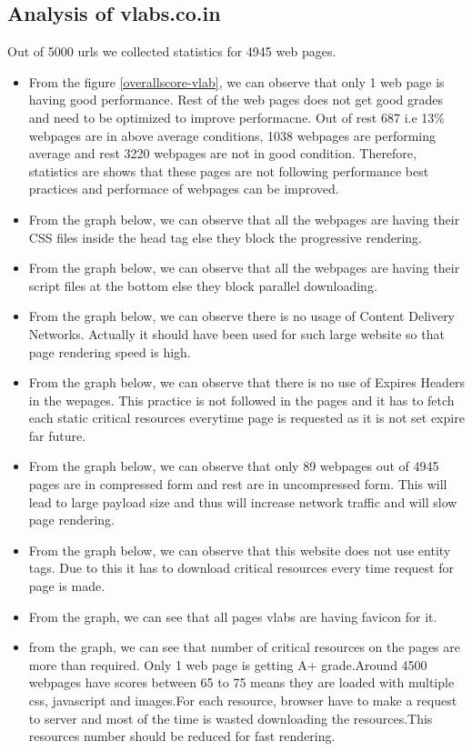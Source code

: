 \documentclass[conference]{IEEEtran}
\begin{document}
\subsection{Analysis of vlabs.co.in}
 Out of 5000 urls we collected statistics for 4945 web pages.
\begin{itemize}
\item From the figure \ref{overallscore-vlab}, we can observe that only 1 web page is having good
performance. Rest of the web pages does not get good grades and need to be
optimized to improve performacne. Out of rest 687 i.e 13\% webpages are in above average conditions, 1038
webpages are performing average and rest 3220 webpages are not in good
condition. Therefore, statistics are shows that these pages are not following
performance best practices and performace of webpages can be improved.  
 
\item From the graph below, we can observe that all the webpages are having their
CSS files inside the head tag else they block the progressive rendering.

\item From the graph below, we can observe that all the webpages are having their
script files at the bottom else they block parallel downloading.

\item From the graph below, we can observe there is no usage of Content Delivery
Networks. Actually it should have been used for such large website so that page
rendering speed is high.

\item From the graph below, we can observe that there is no use of Expires
Headers in the wepages. This practice is not followed in the pages and it has to
fetch each static critical resources everytime page is requested as it is not
set expire far future.

\item From the graph below, we can observe that only 89 webpages out of 4945
pages are in compressed form and rest are in uncompressed form. This will lead to
large payload size and thus will increase network traffic and will slow page
rendering.
\item From the graph below, we can observe that this website does not use entity
tags. Due to this it has to download critical resources every time request for page is
made.
\item From the graph, we can see that all pages vlabs are having favicon for it.
\item from the graph, we can see that number of critical resources  on the pages
are more than required. Only 1 web page is getting A+ grade.Around 4500 webpages
have scores between 65 to 75 means they are loaded with multiple css, javascript
and images.For each resource, browser have to make a request to server and most
of the time is wasted downloading the resources.This resources  number should be
reduced for fast rendering.
\end{itemize}
\end{document}
